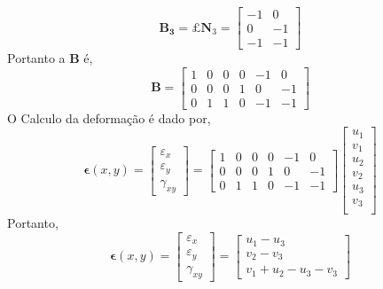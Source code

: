 %
\begin{equation}
	\mathbf{B_3} = \pounds \mathbf{N}_3 = 
	\begin{bmatrix}
		-1& 0\\
		0& -1\\
		-1& -1
	\end{bmatrix}
\end{equation}
%
Portanto a $\mathbf{B}$ é,
%
\begin{equation}
	\mathbf{B} = 
	\begin{bmatrix}
		 1& 0   & 0 & 0 & -1 & 0\\
		 0& 0  & 0 & 1 &  0 & -1\\
		 0& 1  & 1 & 0 & -1 & -1
	\end{bmatrix}
\end{equation}
% 
O Calculo da deformação é dado por,
%
\begin{equation}
	\mathbf{\epsilon}(x, y) = 
	\begin{bmatrix}
	\varepsilon_x\\
	\varepsilon_y\\
	\gamma_{xy}	
	\end{bmatrix}
	 = 
	\begin{bmatrix}
		1& 0   & 0 & 0 & -1 & 0\\
		0& 0  & 0 & 1 &  0 & -1\\
		0& 1  & 1 & 0 & -1 & -1
	\end{bmatrix}
	\begin{bmatrix}
	u_1\\
	v_1\\
	u_2\\
	v_2\\
	u_3\\
	v_3\\	
    \end{bmatrix}
\end{equation}
%
Portanto,
\begin{equation}
	\mathbf{\epsilon}(x, y) = 
	\begin{bmatrix}
	\varepsilon_x\\
	\varepsilon_y\\
	\gamma_{xy}	
	\end{bmatrix}
	= 
	\begin{bmatrix}
	u_1 - u_3\\
	v_2 - v_3\\
	v_1 + u_2 - u_3 - v_3
	\end{bmatrix}
\end{equation}

